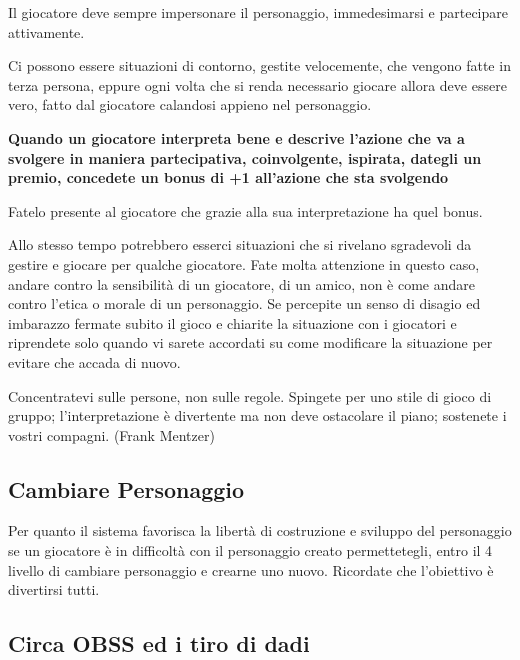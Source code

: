 \begin{multicols}{2}
Il giocatore deve sempre impersonare il personaggio, immedesimarsi e partecipare attivamente.

Ci possono essere situazioni di contorno, gestite velocemente, che vengono fatte in terza persona, eppure ogni volta che si renda necessario giocare allora deve essere vero, fatto dal giocatore calandosi appieno nel personaggio.

\medskip

\textbf{Quando un giocatore interpreta bene e descrive l'azione che va a svolgere in maniera \textbf{partecipativa}, \textbf{coinvolgente}, \textbf{ispirata}, dategli un premio, concedete un bonus di +1 all'azione che sta svolgendo}

\medskip

Fatelo presente al giocatore che grazie alla sua interpretazione ha quel bonus.

Allo stesso tempo potrebbero esserci situazioni che si rivelano sgradevoli da gestire e giocare per qualche giocatore. Fate molta attenzione in questo caso, andare contro la sensibilità di un giocatore, di un amico, non è come andare contro l'etica o morale di un personaggio. Se percepite un senso di disagio ed imbarazzo fermate subito il gioco e chiarite la situazione con i giocatori e riprendete solo quando vi sarete accordati su come modificare la situazione per evitare che accada di nuovo.

\begin{enfasi}
{Concentratevi sulle persone, non sulle regole. Spingete per uno stile di gioco di gruppo; l'interpretazione è divertente ma non deve ostacolare il piano; sostenete i vostri compagni. (Frank Mentzer)}\end{enfasi}

\subsection{Cambiare Personaggio}

Per quanto il sistema favorisca la libertà di costruzione e sviluppo del personaggio se un giocatore è in difficoltà con il personaggio creato permettetegli, entro il 4 livello di cambiare personaggio e crearne uno nuovo. Ricordate che l'obiettivo è divertirsi tutti.

\subsection{Circa OBSS ed i tiro di dadi}\label{obssedadi}


\end{multicols}
